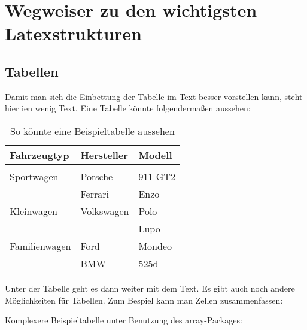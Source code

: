 \chapter {Wegweiser zu den wichtigsten Latexstrukturen}\label{text:main}

\section {Tabellen}

Damit man sich die Einbettung der Tabelle im Text besser vorstellen kann, steht hier ien wenig Text. Eine Tabelle könnte folgendermaßen aussehen:

	\begin{table}[h]
		\begin{center} %
			\caption[Kurzfassung f. Inhaltsverz.]{So könnte eine Beispieltabelle aussehen} \vspace{2ex} %
			
			\begin{tabular}{lll}         %
			\textbf{Fahrzeugtyp} & \textbf{Hersteller}& \textbf{Modell}\\
			\hline \hline   %
			  &\\
			  Sportwagen & Porsche & 911 GT2 \\
			   & Ferrari & Enzo \\
			  Kleinwagen & Volkswagen & Polo \\
			   & & Lupo \\
			  Familienwagen & Ford & Mondeo \\
			   & BMW & 525d \\
			  \hline
			 \end{tabular}
			\label{tbl:Autos}		%
		\end{center}
	\end{table}

Unter der Tabelle geht es dann weiter mit dem Text. Es gibt auch noch andere Möglichkeiten für Tabellen. Zum Bespiel kann man Zellen zusammenfassen:

Komplexere Beispieltabelle unter Benutzung des array-Packages:


